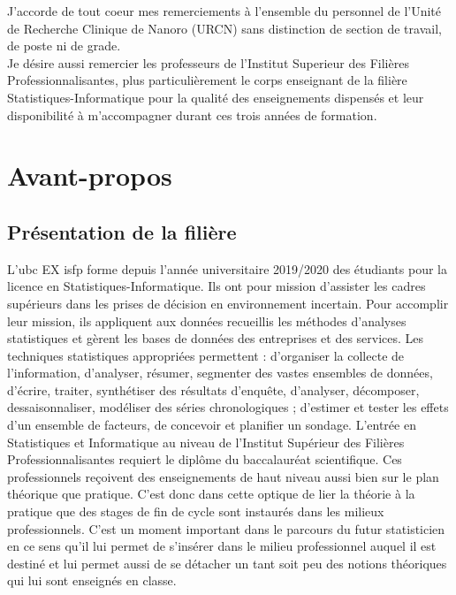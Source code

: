 \documentclass[12pt]{report}
\begin{document}
	
	J'accorde de tout  coeur mes remerciements à l'ensemble du personnel de  l'Unité de Recherche Clinique de Nanoro (URCN) sans distinction de section de travail, de poste ni de grade. \\
	
	
	Je désire aussi remercier les professeurs de l'Institut Superieur des Filières Professionnalisantes, plus particulièrement le corps enseignant de la filière Statistiques-Informatique pour la qualité des enseignements dispensés et leur disponibilité à m'accompagner durant ces trois années de formation.
	
	\newpage
	
	\chapter*{Avant-propos}       %
	
	\vspace*{2cm}
	
	
	\section*{Présentation de la filière}
	\vspace*{1cm}
	
	
	L'\gls{ubc} EX \gls{isfp} forme depuis l’année universitaire 2019/2020 des étudiants pour la licence en Statistiques-Informatique. Ils ont pour mission d’assister les cadres supérieurs dans les prises de décision en environnement incertain. Pour accomplir leur mission, ils appliquent aux données recueillis les méthodes d’analyses statistiques et gèrent les bases de données des entreprises et des services. Les techniques statistiques appropriées permettent : d’organiser la collecte de l’information, d’analyser, résumer,
	segmenter des vastes ensembles de données, d’écrire, traiter, synthétiser des résultats d’enquête, d’analyser, décomposer, dessaisonnaliser, modéliser des séries chronologiques ; d’estimer
	et tester les effets d’un ensemble de facteurs, de concevoir et planifier un sondage. L’entrée en
	Statistiques et Informatique au niveau de l’Institut Supérieur des Filières Professionnalisantes
	requiert le diplôme du baccalauréat scientifique. Ces professionnels reçoivent des enseignements
	de haut niveau aussi bien sur le plan théorique que pratique. C’est donc dans cette optique
	de lier la théorie à la pratique que des stages de fin de cycle sont instaurés dans les milieux
	professionnels. C’est un moment important dans le parcours du futur statisticien en ce sens
	qu’il lui permet de s’insérer dans le milieu professionnel auquel il est destiné et lui permet aussi
	de se détacher un tant soit peu des notions théoriques qui lui sont enseignés en classe.
	
\end{document}
